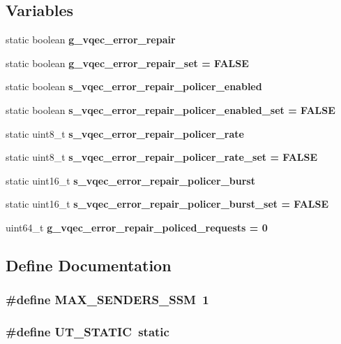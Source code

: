\subsection*{Variables}
\begin{CompactItemize}
\item 
static boolean \bf{g\_\-vqec\_\-error\_\-repair}
\item 
static boolean \bf{g\_\-vqec\_\-error\_\-repair\_\-set} = \bf{FALSE}
\item 
static boolean \bf{s\_\-vqec\_\-error\_\-repair\_\-policer\_\-enabled}
\item 
static boolean \bf{s\_\-vqec\_\-error\_\-repair\_\-policer\_\-enabled\_\-set} = \bf{FALSE}
\item 
static uint8\_\-t \bf{s\_\-vqec\_\-error\_\-repair\_\-policer\_\-rate}
\item 
static uint8\_\-t \bf{s\_\-vqec\_\-error\_\-repair\_\-policer\_\-rate\_\-set} = \bf{FALSE}
\item 
static uint16\_\-t \bf{s\_\-vqec\_\-error\_\-repair\_\-policer\_\-burst}
\item 
static uint16\_\-t \bf{s\_\-vqec\_\-error\_\-repair\_\-policer\_\-burst\_\-set} = \bf{FALSE}
\item 
uint64\_\-t \bf{g\_\-vqec\_\-error\_\-repair\_\-policed\_\-requests} = 0
\end{CompactItemize}


\subsection{Define Documentation}
\subsubsection{\setlength{\rightskip}{0pt plus 5cm}\#define MAX\_\-SENDERS\_\-SSM~1}\label{vqec__gap__reporter_8c_9b6196bbf8f53106c05338123545b11f}


\subsubsection{\setlength{\rightskip}{0pt plus 5cm}\#define UT\_\-STATIC~static}\label{vqec__gap__reporter_8c_840be0a802b42af3ce4430a7173caa40}





